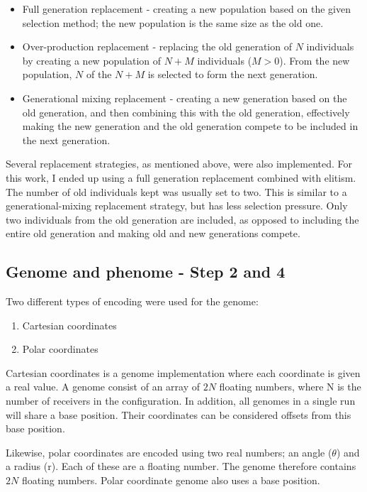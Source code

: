 \documentclass[10pt,a4paper]{book}
\begin{document}
\begin{itemize}
\item Full generation replacement - creating a new population based on the given selection method; the new population is the same size as the old one.
\item Over-production replacement - replacing the old generation of $N$ individuals by creating a new population of $N+M$ individuals ($M > 0$). From the new population, $N$ of the $N+M$ is selected to form the next generation.
\item Generational mixing replacement - creating a new generation based on the old generation, and then combining this with the old generation, effectively making the new generation and the old generation compete to be included in the next generation.
\end{itemize}

Several replacement strategies, as mentioned above, were also implemented. For this work, I ended up using a full generation replacement combined with elitism. The number of old individuals kept was usually set to two. This is similar to a generational-mixing replacement strategy, but has less selection pressure. Only two individuals from the old generation are included, as opposed to including the entire old generation and making old and new generations compete.




\subsection{Genome and phenome - Step 2 and 4}
\label{GP}

Two different types of encoding were used for the genome:

\begin{enumerate}
\item Cartesian coordinates
\item Polar coordinates
\end{enumerate}

Cartesian coordinates is a genome implementation where each coordinate is given a real value. A genome consist of an array of $2N$ floating numbers, where N is the number of receivers in the configuration. In addition, all genomes in a single run will share a base position. Their coordinates can be considered offsets from this base position.

Likewise, polar coordinates are encoded using two real numbers; an angle ($\theta$) and a radius (r). Each of these are a floating number. The genome therefore contains $2N$ floating numbers. Polar coordinate genome also uses a base position.
\end{document}
